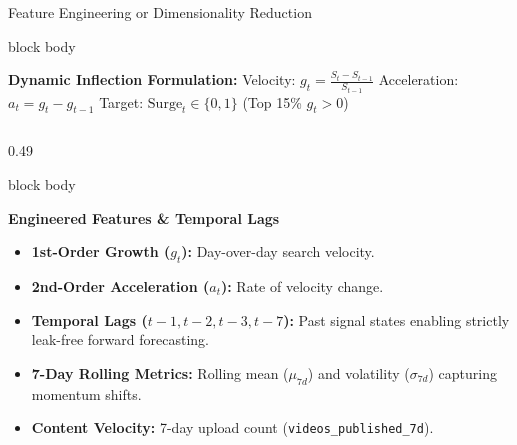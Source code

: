 \documentclass[aspectratio=169, 10pt]{beamer}
\newenvironment{card}[1][]{%
    \begin{beamercolorbox}[rounded=true,shadow=false,wd=\linewidth,sep=4pt,#1]{block body}%
}{%
    \end{beamercolorbox}%
}
\begin{document}
\begin{frame}{Feature Engineering or Dimensionality Reduction}
    \vspace{-0.1cm}
    \begin{card}
        \centering
        {\fontsize{8pt}{9.5pt}\selectfont \textbf{Dynamic Inflection Formulation:} \quad Velocity: $g_t = \frac{S_t - S_{t-1}}{S_{t-1}}$ \quad\textbar\quad Acceleration: $a_t = g_t - g_{t-1}$ \quad\textbar\quad Target: $\text{Surge}_t \in \{0, 1\}$ (Top 15\% $g_t > 0$)}
    \end{card}
    \vspace{0.12cm}

    \begin{columns}[T]
        \begin{column}{0.49\textwidth}
            \begin{card}
                {\fontsize{8.5pt}{10pt}\selectfont \textbf{\color{NavyPrimary}Engineered Features \& Temporal Lags}}\\[0.08cm]
                \begin{itemize}\setlength{\itemsep}{2pt}
                    \item \textbf{1st-Order Growth ($g_t$):} Day-over-day search velocity.
                    \item \textbf{2nd-Order Acceleration ($a_t$):} Rate of velocity change.
                    \item \textbf{Temporal Lags ($t-1, t-2, t-3, t-7$):} Past signal states enabling strictly leak-free forward forecasting.
                    \item \textbf{7-Day Rolling Metrics:} Rolling mean ($\mu_{7d}$) and volatility ($\sigma_{7d}$) capturing momentum shifts.
                    \item \textbf{Content Velocity:} 7-day upload count (\texttt{videos\_published\_7d}).
                \end{itemize}
            \end{card}
        \end{column}


\end{columns}
\end{frame}
\end{document}
